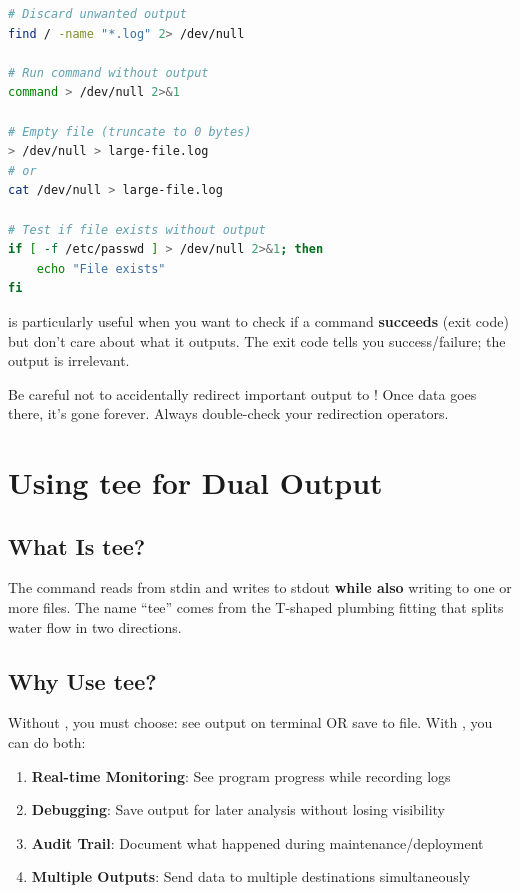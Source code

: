 \begin{lstlisting}[language=bash, caption={Using /dev/null}]
# Discard unwanted output
find / -name "*.log" 2> /dev/null

# Run command without output
command > /dev/null 2>&1

# Empty file (truncate to 0 bytes)
> /dev/null > large-file.log
# or
cat /dev/null > large-file.log

# Test if file exists without output
if [ -f /etc/passwd ] > /dev/null 2>&1; then
    echo "File exists"
fi
\end{lstlisting}

\begin{tipbox}
	 is particularly useful when you want to check if a command \textbf{succeeds} (exit code) but don't care about what it outputs. The exit code tells you success/failure; the output is irrelevant.
\end{tipbox}

\begin{warningbox}
	Be careful not to accidentally redirect important output to ! Once data goes there, it's gone forever. Always double-check your redirection operators.
\end{warningbox}

\section{Using tee for Dual Output}
\label{sec:tee-command}

\subsection{What Is tee?}

The  command reads from stdin and writes to stdout \textbf{while also} writing to one or more files. The name ``tee'' comes from the T-shaped plumbing fitting that splits water flow in two directions.

\subsection{Why Use tee?}

Without , you must choose: see output on terminal OR save to file. With , you can do both:

\begin{enumerate}
	\item \textbf{Real-time Monitoring}: See program progress while recording logs
	\item \textbf{Debugging}: Save output for later analysis without losing visibility
	\item \textbf{Audit Trail}: Document what happened during maintenance/deployment
	\item \textbf{Multiple Outputs}: Send data to multiple destinations simultaneously
\end{enumerate}

